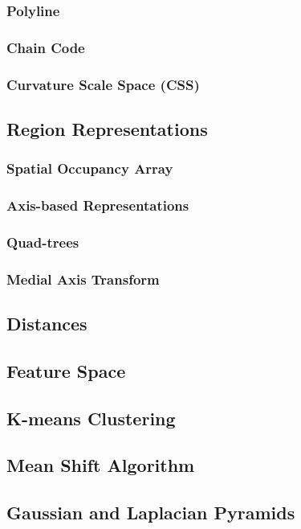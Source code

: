 \documentclass{article}
\begin{document}
\begin{multicols}{2}
 \subsubsection{Polyline}
 \subsubsection{Chain Code}
 \subsubsection{Curvature Scale Space (CSS)}

 \subsection{Region Representations}
 \subsubsection{Spatial Occupancy Array}
 \subsubsection{Axis-based Representations}
 \subsubsection{Quad-trees}
 \subsubsection{Medial Axis Transform}


\subsection{Distances}
\subsection{Feature Space}
\subsection{K-means Clustering}
\subsection{Mean Shift Algorithm}
\subsection{Gaussian and Laplacian Pyramids}


\end{multicols}
\end{document}
